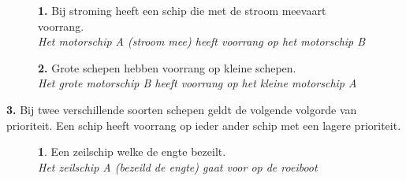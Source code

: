 \begin{figure}[H]
	\centering
	\begin{minipage}[t]{0.70\textwidth}
		\textbf{1.} Bij stroming heeft een schip die met de stroom meevaart voorrang.\\
		\textit{Het motorschip A (stroom mee) heeft voorrang op het motorschip B}
	\end{minipage}
	\hfill
	\begin{minipage}[t]{0.25\textwidth}
		\label{pic:engte:1}
	\end{minipage}
	\hfill
\end{figure}
\vspace{-0.7cm}

\begin{figure}[H]
	\centering
	\begin{minipage}[t]{0.70\textwidth}
		\textbf{2.} Grote schepen hebben voorrang op kleine schepen.\\
		\textit{Het grote motorschip B heeft voorrang op het kleine motorschip A}
	\end{minipage}
	\hfill
	\begin{minipage}[t]{0.25\textwidth}
		\label{pic:engte:2}
	\end{minipage}
	\hfill
\end{figure}
\vspace{-0.5cm}

\textbf{3.} Bij twee verschillende soorten schepen geldt de volgende volgorde van prioriteit. Een schip heeft voorrang op ieder ander schip met een lagere prioriteit.
\vspace{-0.5cm}
\begin{figure}[H]
	\centering
	\hspace{0.02\textwidth}
	\begin{minipage}[t]{0.70\textwidth}
		\textbf{1}. Een zeilschip welke de engte bezeilt\footnotemark. \\
		\textit{Het zeilschip A (bezeild de engte) gaat voor op de roeiboot}
	\end{minipage}
	\hfill
	\begin{minipage}[t]{0.25\textwidth}
		\label{pic:engte:3}
	\end{minipage}
	\hfill
\end{figure}
\vspace{-0.7cm}

